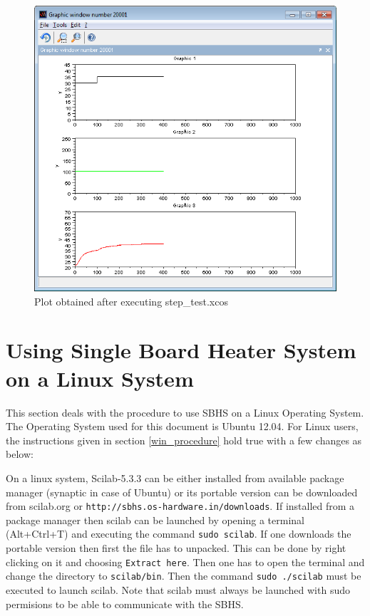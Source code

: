 

\begin{figure}
\centering
\includegraphics[width=0.7\linewidth]{using-sbhs/plot.png}
\caption{Plot obtained after executing step\_test.xcos}
\label{plots}
\end{figure}

\section{Using Single Board Heater System on a Linux System}\label{linux-sbhs}
This section deals with the procedure to use SBHS on a Linux Operating System. The Operating System used for this document is Ubuntu 12.04.
For Linux users, the instructions given in section \ref{win_procedure} hold true with a few changes as below:

 On a linux system, Scilab-5.3.3 can be either installed from available package manager (synaptic in case of Ubuntu) or its portable version can be downloaded from {scilab.org} or {\tt http://sbhs.os-hardware.in/downloads}. If installed from a package manager then scilab can be launched by opening a terminal (Alt+Ctrl+T) and executing the command {\tt sudo scilab}. If one downloads the portable version then first the file has to unpacked. This can be done by right clicking on it and choosing {\tt Extract here}. Then one has to open the terminal and change the directory to {\tt scilab/bin}. Then the command {\tt sudo ./scilab} must be executed to launch scilab. Note that scilab must always be launched with sudo permisions to be able to communicate with the SBHS.


